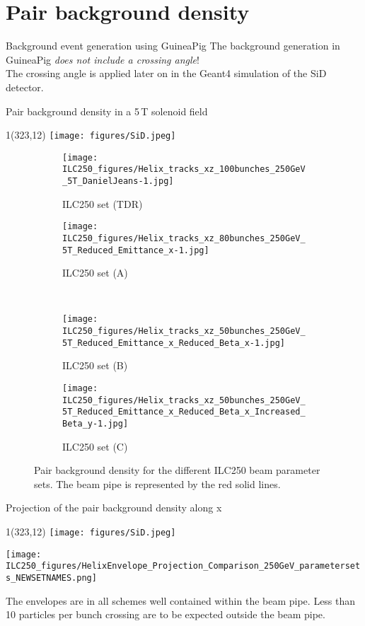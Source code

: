 \documentclass[xcolor={dvipsnames}]{beamer}
\newcommand{\sidlogo}{
  \setlength{\TPHorizModule}{1pt}
  \setlength{\TPVertModule}{1pt}
  \begin{textblock}{1}(323,12)
   \texttt{[image: figures/SiD.jpeg]}
  \end{textblock}
  }
\begin{document}
\section{Pair background density}
\begin{frame}{Background event generation using GuineaPig}
 The background generation in GuineaPig \textit{does not include a crossing angle}!\\
 The crossing angle is applied later on in the Geant4 simulation of the SiD detector.
\end{frame}

\begin{frame}{Pair background density in a 5\,T solenoid field}
\sidlogo
 \begin{figure}
\centering
\begin{subfigure}[t]{0.35\textwidth}
\centering
\texttt{[image: ILC250\_figures/Helix\_tracks\_xz\_100bunches\_250GeV\_5T\_DanielJeans-1.jpg]}
\caption{ILC250 set (TDR)}
\end{subfigure}
\hspace*{0.1cm}
\begin{subfigure}[t]{0.35\textwidth}
\centering
\texttt{[image: ILC250\_figures/Helix\_tracks\_xz\_80bunches\_250GeV\_5T\_Reduced\_Emittance\_x-1.jpg]}
\caption{ILC250 set (A)}
\end{subfigure}
\\
\begin{subfigure}[t]{0.35\textwidth}
\centering
\texttt{[image: ILC250\_figures/Helix\_tracks\_xz\_50bunches\_250GeV\_5T\_Reduced\_Emittance\_x\_Reduced\_Beta\_x-1.jpg]}
\caption{ILC250 set (B)}
\end{subfigure}
\hspace*{0.1cm}
\begin{subfigure}[t]{0.35\textwidth}
\centering
\texttt{[image: ILC250\_figures/Helix\_tracks\_xz\_50bunches\_250GeV\_5T\_Reduced\_Emittance\_x\_Reduced\_Beta\_x\_Increased\_Beta\_y-1.jpg]}
\caption{ILC250 set (C)}
\end{subfigure}
\caption{Pair background density for the different ILC250 beam parameter sets.
The beam pipe is represented by the red solid lines.}
\label{fig:Envelopes}
\end{figure}

\end{frame}

\begin{frame}{Projection of the pair background density along x}
\sidlogo
\begin{center}
 \texttt{[image: ILC250\_figures/HelixEnvelope\_Projection\_Comparison\_250GeV\_parametersets\_NEWSETNAMES.png]}
\end{center}
The envelopes are in all schemes well contained within the beam pipe. Less than 10 particles per bunch crossing are to be expected outside the beam pipe.
\end{frame}
\end{document}
